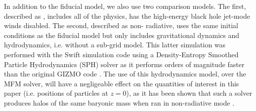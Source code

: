 In addition to the fiducial model, we also use two comparison models. The
first, described as \nojet{}, includes all of the \simba{} physics, has the
high-energy black hole jet-mode winds disabled. The second, described as non-
radiative, uses the same initial conditions as the fiducial model but only
includes gravitational dynamics and hydrodynamics, i.e. without a sub-grid
model. This latter simulation was performed with the {\sc Swift} simulation
code \citep{Schaller2016} using a Density-Entropy Smoothed Particle
Hydrodynamics (SPH) solver as it performs orders of magnitude faster than the
original GIZMO code \citep{Borrow2018}. The use of this hydrodynamics model,
over the MFM solver, will have a negligeable effect on the quantities of
interest in this paper (i.e. positions of particles at $z=0$), as it has been
shown that such a solver produces halos of the same baryonic mass when ran in
non-radiative mode \citep[see e.g.][]{Sembolini2016}.
